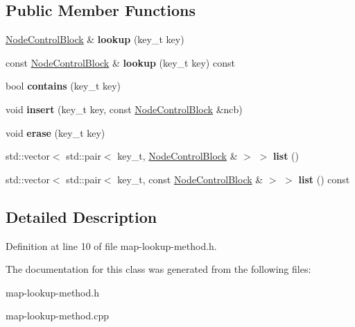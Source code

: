 \subsection*{Public Member Functions}
\begin{DoxyCompactItemize}
\item 
\mbox{\label{class_hash_octree_1_1_map_lookup_method_ac226e4793af4d493451974f056691c06}} 
\mbox{\hyperlink{class_hash_octree_1_1_node_control_block}{Node\+Control\+Block}} \& {\bfseries lookup} (key\+\_\+t key)
\item 
\mbox{\label{class_hash_octree_1_1_map_lookup_method_ad092d8b2df8efe36c2e3c24d7bdfad43}} 
const \mbox{\hyperlink{class_hash_octree_1_1_node_control_block}{Node\+Control\+Block}} \& {\bfseries lookup} (key\+\_\+t key) const
\item 
\mbox{\label{class_hash_octree_1_1_map_lookup_method_afef7db4847b23a81137afa921915ffa0}} 
bool {\bfseries contains} (key\+\_\+t key)
\item 
\mbox{\label{class_hash_octree_1_1_map_lookup_method_ab56c8f3c99671df22b0d8ade4ccabb46}} 
void {\bfseries insert} (key\+\_\+t key, const \mbox{\hyperlink{class_hash_octree_1_1_node_control_block}{Node\+Control\+Block}} \&ncb)
\item 
\mbox{\label{class_hash_octree_1_1_map_lookup_method_a1179a856997e2c6feaf30a3aa0060611}} 
void {\bfseries erase} (key\+\_\+t key)
\item 
\mbox{\label{class_hash_octree_1_1_map_lookup_method_adf3471a4f1114b6304026391cd6ae7ec}} 
std\+::vector$<$ std\+::pair$<$ key\+\_\+t, \mbox{\hyperlink{class_hash_octree_1_1_node_control_block}{Node\+Control\+Block}} \& $>$ $>$ {\bfseries list} ()
\item 
\mbox{\label{class_hash_octree_1_1_map_lookup_method_a9374b94be85a96e3f9b85f7d9fd954dd}} 
std\+::vector$<$ std\+::pair$<$ key\+\_\+t, const \mbox{\hyperlink{class_hash_octree_1_1_node_control_block}{Node\+Control\+Block}} \& $>$ $>$ {\bfseries list} () const
\end{DoxyCompactItemize}


\subsection{Detailed Description}


Definition at line 10 of file map-\/lookup-\/method.\+h.



The documentation for this class was generated from the following files\+:\begin{DoxyCompactItemize}
\item 
map-\/lookup-\/method.\+h\item 
map-\/lookup-\/method.\+cpp\end{DoxyCompactItemize}
